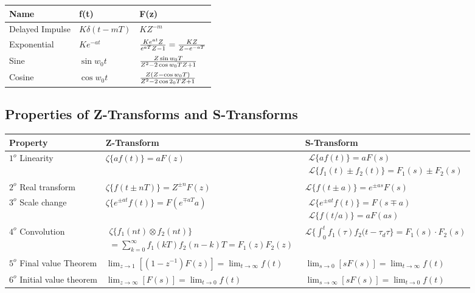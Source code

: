 \documentclass[11pt,fleqn]{book} %
\begin{document}
\begin{table}[h]
  \centering
  \begin{tabulary}{1\textwidth}{|l|l|l|}
    \hline
    \textbf{Name} & \textbf{f(t)} & \textbf{F(z)}\\
    \hline
    Delayed Impulse & $K\delta(t-mT)$ & $KZ^{-m}$ \\
    Exponential & $Ke^{-at}$ & ${Ke^{at}Z\over e^{aT}Z-1}={KZ\over Z-e^{-aT}}$ \\
    Sine & $\sin w_0t$ & ${Z\sin w_0T\over Z^2-2\cos w_0TZ+1}$ \\
    Cosine & $\cos w_0t$ & ${Z(Z-\cos w_0 T)\over Z^2-2\cos 2_0TZ+1}$ \\
    \hline
  \end{tabulary}
\end{table}

\subsection{Properties of Z-Transforms and S-Transforms}

\begin{table}[h]
  \centering
  \begin{tabulary}{1\textwidth}{|l|L|L|}
    \hline
    \textbf{Property} & \textbf{Z-Transform} & \textbf{S-Transform}\\
    \hline
    $1^o$ Linearity & $\zeta\{af(t)\}=aF(z)$ & $\substack{\mathcal{L}\{af(t)\}=aF(s)\\
    \mathcal{L}\{f_1(t)\pm f_2(t)\}=F_1(s)\pm F_2(s)}$ \\
    $2^o$ Real transform & $\zeta\{f(t\pm nT)\}=Z^{\pm n} F(z)$ & $\mathcal{L}\{f(t\pm a)\}=e^{\pm as}F(s)$ \\
    $3^o$ Scale change & $\zeta\{e^{\pm at}f(t)\}=F(e^{\mp aT}a)$ & $\substack{\mathcal{L}\{e^{\pm at}f(t)\}=F(s\mp a)\\
    \mathcal{L}\{f(t/a)\}=aF(as)}$ \\
    $4^o$ Convolution & $ \substack{\zeta\{f_1(nt)\otimes f_2(nt)\}\\
    =\sum_{k=0}^\infty f_1(kT)f_2(n-k)T=F_1(z)F_2(z)}$ & $\mathcal{L}\{\int_0^tf_1(\tau)f_2(t-\tau_d\tau\}=F_1(s)\cdot F_2(s)$ \\
    $5^o$ Final value Theorem & $\lim_{z\to 1}\left[(1-z^{-1})F(z)\right]=\lim_{t\to\infty}f(t)$ & $\lim_{s\to 0}[sF(s)]=\lim_{t\to\infty}f(t)$ \\
    $6^o$ Initial value theorem & $\lim_{z\to\infty}[F(s)]=\lim_{t\to 0}f(t)$ & $\lim_{s\to\infty}[sF(s)]=\lim_{t\to 0}f(t)$ \\
    \hline
  \end{tabulary}
\end{table}
\end{document}
